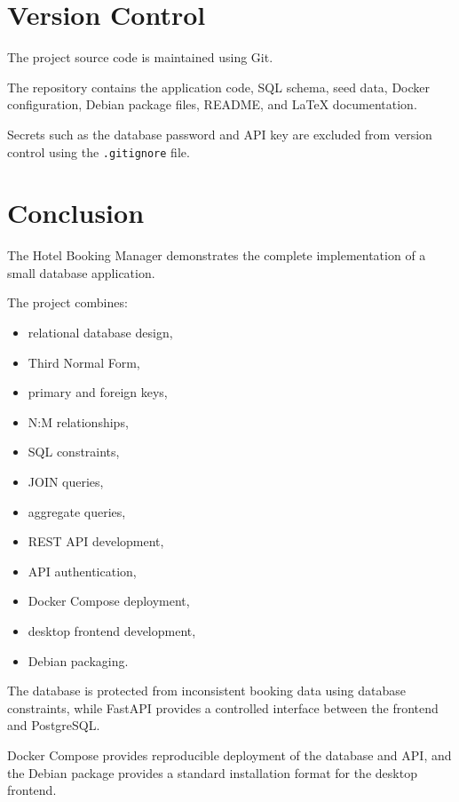 \documentclass[12pt,a4paper]{article}
\begin{document}
\section{Version Control}

The project source code is maintained using Git.

The repository contains the application code, SQL schema, seed data,
Docker configuration, Debian package files, README, and LaTeX
documentation.

Secrets such as the database password and API key are excluded from
version control using the \texttt{.gitignore} file.

\section{Conclusion}

The Hotel Booking Manager demonstrates the complete implementation of a
small database application.

The project combines:

\begin{itemize}
    \item relational database design,
    \item Third Normal Form,
    \item primary and foreign keys,
    \item N:M relationships,
    \item SQL constraints,
    \item JOIN queries,
    \item aggregate queries,
    \item REST API development,
    \item API authentication,
    \item Docker Compose deployment,
    \item desktop frontend development,
    \item Debian packaging.
\end{itemize}

The database is protected from inconsistent booking data using database
constraints, while FastAPI provides a controlled interface between the
frontend and PostgreSQL.

Docker Compose provides reproducible deployment of the database and API,
and the Debian package provides a standard installation format for the
desktop frontend.
\end{document}
